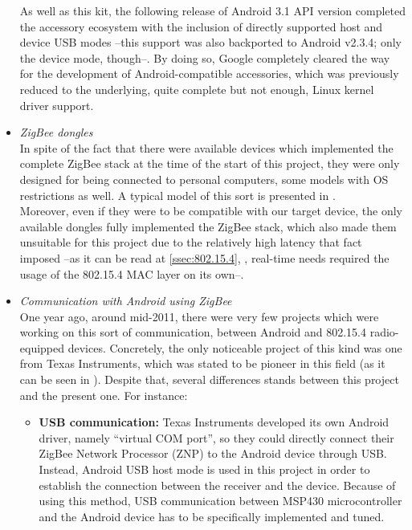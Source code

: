 \begin{itemize}
				As well as this kit, the following release of Android 3.1 API version completed
				the accessory ecosystem with the inclusion of directly supported host and device
				USB modes --this support was also backported to Android v2.3.4; only the device mode, though--.
				By doing so, Google completely cleared the way for the development of Android-compatible accessories, 
				which was previously reduced to the underlying, quite complete but not enough, Linux kernel driver 
				support.\\
			\item \emph{ZigBee dongles}\\
				In spite of the fact that there were available devices which implemented the complete ZigBee
				stack at the time of the start of this project, they were only designed for being connected to
				personal computers, some models with OS restrictions as well. A typical model of this sort is
				presented in \cite{dongle}.\\
				Moreover, even if they were to be compatible with our target device, the only available dongles
				fully implemented the ZigBee stack, which also made them unsuitable for this project due to the
				relatively high latency that fact imposed --as it can be read at \autoref{ssec:802.15.4},
				, real-time needs required the usage of the 802.15.4 MAC layer on
				its own--.
			\item \emph{Communication with Android using ZigBee}\\
				One year ago, around mid-2011, there were very few projects which were working on this sort of
				communication, between Android and 802.15.4 radio-equipped devices. Concretely, the only noticeable
				project of this kind was one from Texas Instruments, which was stated to be pioneer in 
				this field (as it can be seen in \cite{articleTI}). Despite that, several differences stands between 
				this project and the present one. For instance:
				\begin{itemize}
					\item \textbf{USB communication:} Texas Instruments developed its own Android driver, namely
						``virtual COM port'', so they could directly connect their ZigBee Network Processor (ZNP)
						to the Android device through USB. Instead, Android USB host mode is used in this project
						in order to establish the connection between the receiver and the device. Because of
						using this method, USB communication between MSP430 microcontroller and the Android
						device has to be specifically implemented and tuned.

\end{itemize}
\end{itemize}
